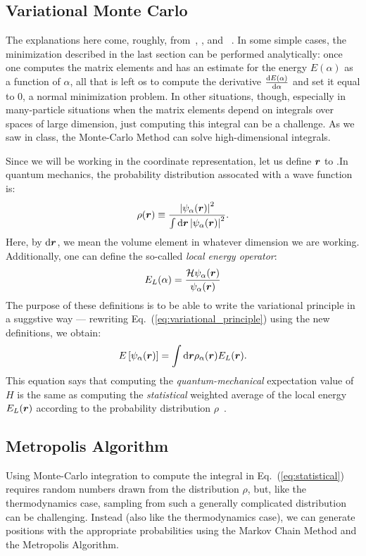 \documentclass[12pt]{article}
\renewcommand{\d}{\mathrm{d}}
\numberwithin{equation}{section}
\begin{document}
\subsection{Variational Monte Carlo}
The explanations here come, roughly, from~\cite{jensen}, \cite{Jensen2}, and ~\cite{sorella_2013}.  In some simple cases, the minimization described in the last section can be performed analytically: once one computes the matrix elements and has an estimate for the energy $E(\alpha)$ as a function of $\alpha$, all that is left os to compute the derivative $\dv{E(\alpha)}{\alpha}$ and set it equal to $0$, a normal minimization problem.  In other situations, though, especially in many-particle situations when the matrix elements depend on integrals over spaces of large dimension, just computing this integral can be a challenge.  As we saw in class, the Monte-Carlo Method can solve high-dimensional integrals.

Since we will be working in the coordinate representation, let us define $\vb*r$ to .In quantum mechanics, the probability distribution assocated with a wave function is:
\begin{equation}
    \rho(\vb*r) \equiv \frac{\left| \psi_\alpha(\vb*r) \right|^2}{ \int\d \vb*r \left| \psi_\alpha(\vb*r) \right|^2}.
\end{equation}
Here, by $\d \vb*r$, we mean the volume element in whatever dimension we are working. Additionally, one can define the so-called \textit{local energy operator}:
\begin{equation}
    E_L(\alpha) = \frac{\mathcal{H}\psi_\alpha(\vb*r)}{\psi_\alpha(\vb*r)}
\end{equation}
The purpose of these definitions is to be able to write the variational principle in a suggstive way --- rewriting Eq.~(\ref{eq:variational_principle}) using the new definitions, we obtain:
\begin{align}
    \label{eq:statistical}
    E \left[ \psi_\alpha(\vb*r) \right] = \int \d \vb*r \rho_\alpha(\vb*r) E_L(\vb*r).
\end{align}
This equation says that computing the \textit{quantum-mechanical} expectation value of $H$ is the same as computing the \textit{statistical} weighted average of the local energy $E_L(\vb*r)$ according to the probability distribution $\rho$~\cite{newman_2013}.

\subsection{Metropolis Algorithm}
Using Monte-Carlo integration to compute the integral in Eq.~(\ref{eq:statistical}) requires random numbers drawn from the distribution $\rho$, but, like the thermodynamics case, sampling from such a generally complicated distribution can be challenging.  Instead (also like the thermodynamics case), we can generate positions with the appropriate probabilities using the Markov Chain Method and the Metropolis Algorithm.
\end{document}
